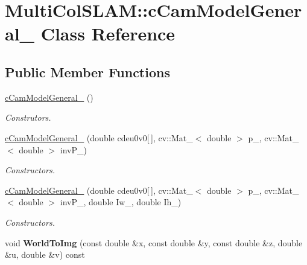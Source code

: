 \hypertarget{classMultiColSLAM_1_1cCamModelGeneral__}{}\section{Multi\+Col\+S\+L\+AM\+:\+:c\+Cam\+Model\+General\+\_\+ Class Reference}
\label{classMultiColSLAM_1_1cCamModelGeneral__}
\subsection*{Public Member Functions}
\begin{DoxyCompactItemize}
\item 
\hyperlink{classMultiColSLAM_1_1cCamModelGeneral___aa996b3a333071918c982dd9b523d6dc5}{c\+Cam\+Model\+General\+\_\+} ()\hypertarget{classMultiColSLAM_1_1cCamModelGeneral___aa996b3a333071918c982dd9b523d6dc5}{}\label{classMultiColSLAM_1_1cCamModelGeneral___aa996b3a333071918c982dd9b523d6dc5}

\begin{DoxyCompactList}\small\item\em Construtors. \end{DoxyCompactList}\item 
\hyperlink{classMultiColSLAM_1_1cCamModelGeneral___ab14c20bc25f0405247e4925cc58844a3}{c\+Cam\+Model\+General\+\_\+} (double cdeu0v0\mbox{[}$\,$\mbox{]}, cv\+::\+Mat\+\_\+$<$ double $>$ p\+\_\+, cv\+::\+Mat\+\_\+$<$ double $>$ inv\+P\+\_\+)
\begin{DoxyCompactList}\small\item\em Constructors. \end{DoxyCompactList}\item 
\hyperlink{classMultiColSLAM_1_1cCamModelGeneral___a145abd938627a2d5f0e28cd47b436fa9}{c\+Cam\+Model\+General\+\_\+} (double cdeu0v0\mbox{[}$\,$\mbox{]}, cv\+::\+Mat\+\_\+$<$ double $>$ p\+\_\+, cv\+::\+Mat\+\_\+$<$ double $>$ inv\+P\+\_\+, double Iw\+\_\+, double Ih\+\_\+)
\begin{DoxyCompactList}\small\item\em Constructors. \end{DoxyCompactList}\item 
void {\bfseries World\+To\+Img} (const double \&x, const double \&y, const double \&z, double \&u, double \&v) const \hypertarget{classMultiColSLAM_1_1cCamModelGeneral___a6a507ea61fabd853dee10ea0e2047f91}{}\label{classMultiColSLAM_1_1cCamModelGeneral___a6a507ea61fabd853dee10ea0e2047f91}


\end{DoxyCompactItemize}
